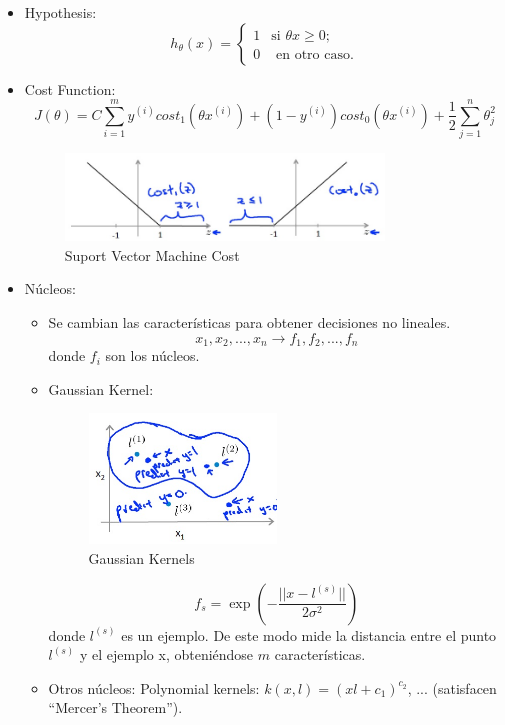 \documentclass[12pt,a4paper]{article}
\begin{document}
\begin{itemize}
\item Hypothesis: 
\[ h_{\theta}(x) = \left\{ \begin{array}{ll}
         1 & \mbox{si $\theta x \geq 0$};\\
         0 & \mbox{ en otro caso}.\end{array} \right. \]
\item Cost Function:
\begin{equation*}
J(\theta) = C \sum_{i=1}^{m} y^{(i)} cost_{1}(\theta x^{(i)})+(1-y^{(i)})cost_{0}(\theta x^{(i)})+\dfrac{1}{2} \sum_{j=1}^{n} \theta_{j}^2
\end{equation*}

\begin{figure}[htb]
\center
\includegraphics[width=0.8\textwidth]{suport_error}
\caption{Suport Vector Machine Cost}
\end{figure}

\item Núcleos:

\begin{itemize}
\item Se cambian las características para obtener decisiones no lineales.
\begin{equation*}
x_1, x_2, ..., x_n \longrightarrow f_1, f_2, ..., f_n
\end{equation*}
donde $f_i$ son los núcleos.
\item Gaussian Kernel:

\begin{figure}[htb]
\center
\includegraphics[width=0.5\textwidth]{suport_kernel}
\caption{Gaussian Kernels}
\end{figure}
\begin{equation*}
f_s = \exp(-\dfrac{||x-l^{(s)}||}{2 \sigma^{2}})
\end{equation*}
donde $l^{(s)}$ es un ejemplo. De este modo mide la distancia entre el punto $l^{(s)}$ y el ejemplo x, obteniéndose $m$ características.
\item Otros núcleos: Polynomial kernels: $k(x,l)= (x l + c_1)^{c_2}$, ... (satisfacen ``Mercer's Theorem'').
\end{itemize}


\end{itemize}
\end{document}
